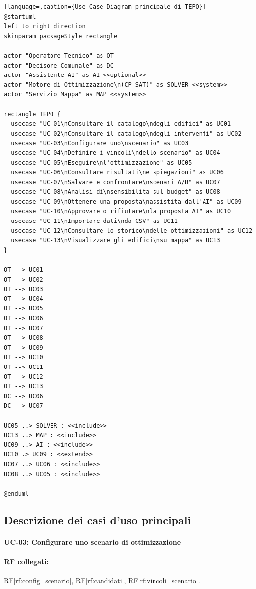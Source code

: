 \begin{lstlisting}[language=,caption={Use Case Diagram principale di TEPO}]
@startuml
left to right direction
skinparam packageStyle rectangle

actor "Operatore Tecnico" as OT
actor "Decisore Comunale" as DC
actor "Assistente AI" as AI <<optional>>
actor "Motore di Ottimizzazione\n(CP-SAT)" as SOLVER <<system>>
actor "Servizio Mappa" as MAP <<system>>

rectangle TEPO {
  usecase "UC-01\nConsultare il catalogo\ndegli edifici" as UC01
  usecase "UC-02\nConsultare il catalogo\ndegli interventi" as UC02
  usecase "UC-03\nConfigurare uno\nscenario" as UC03
  usecase "UC-04\nDefinire i vincoli\ndello scenario" as UC04
  usecase "UC-05\nEseguire\nl'ottimizzazione" as UC05
  usecase "UC-06\nConsultare risultati\ne spiegazioni" as UC06
  usecase "UC-07\nSalvare e confrontare\nscenari A/B" as UC07
  usecase "UC-08\nAnalisi di\nsensibilita sul budget" as UC08
  usecase "UC-09\nOttenere una proposta\nassistita dall'AI" as UC09
  usecase "UC-10\nApprovare o rifiutare\nla proposta AI" as UC10
  usecase "UC-11\nImportare dati\nda CSV" as UC11
  usecase "UC-12\nConsultare lo storico\ndelle ottimizzazioni" as UC12
  usecase "UC-13\nVisualizzare gli edifici\nsu mappa" as UC13
}

OT --> UC01
OT --> UC02
OT --> UC03
OT --> UC04
OT --> UC05
OT --> UC06
OT --> UC07
OT --> UC08
OT --> UC09
OT --> UC10
OT --> UC11
OT --> UC12
OT --> UC13
DC --> UC06
DC --> UC07

UC05 ..> SOLVER : <<include>>
UC13 ..> MAP : <<include>>
UC09 ..> AI : <<include>>
UC10 .> UC09 : <<extend>>
UC07 ..> UC06 : <<include>>
UC08 ..> UC05 : <<include>>

@enduml
\end{lstlisting}


\subsection{Descrizione dei casi d'uso principali}

\paragraph{\large UC-03: Configurare uno scenario di ottimizzazione}

\paragraph{RF collegati:} RF\ref{rf:config_scenario}, RF\ref{rf:candidati}, RF\ref{rf:vincoli_scenario}.

